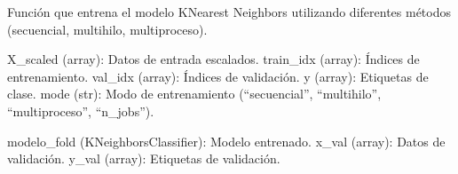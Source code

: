 \documentclass[letterpaper,10pt,spanish]{sphinxmanual}
\begin{document}

\begin{fulllineitems}
\label{\detokenize{Reduccion_Dimension:entrenar_modelos.entrenar_modelo_knn}}
\pysigstartsignatures
\pysiglinewithargsret
{}
{\sphinxparamcomma {}\sphinxparamcomma {}\sphinxparamcomma {}\sphinxparamcomma {}}
{}
\pysigstopsignatures
\sphinxAtStartPar
Función que entrena el modelo K\sphinxhyphen{}Nearest Neighbors utilizando diferentes métodos (secuencial, multihilo, multiproceso).
\begin{description}
\sphinxAtStartPar
X\_scaled (array): Datos de entrada escalados.
train\_idx (array): Índices de entrenamiento.
val\_idx (array): Índices de validación.
y (array): Etiquetas de clase.
mode (str): Modo de entrenamiento (“secuencial”, “multihilo”, “multiproceso”, “n\_jobs”).

\sphinxAtStartPar
modelo\_fold (KNeighborsClassifier): Modelo entrenado.
x\_val (array): Datos de validación.
y\_val (array): Etiquetas de validación.

\end{description}

\end{fulllineitems}

\end{document}
